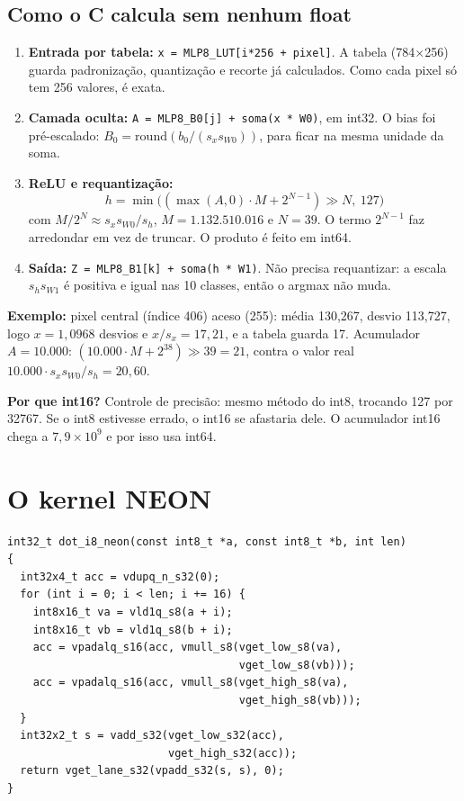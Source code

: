 \documentclass[10pt]{article}
\begin{document}
\subsection{Como o C calcula sem nenhum float}
\begin{enumerate}
\item \textbf{Entrada por tabela:} \texttt{x = MLP8\_LUT[i*256 + pixel]}. A tabela
      (784$\times$256) guarda padronização, quantização e recorte já calculados. Como cada pixel só
      tem 256 valores, é exata.
\item \textbf{Camada oculta:} \texttt{A = MLP8\_B0[j] + soma(x * W0)}, em int32. O bias foi
      pré-escalado: $B_0 = \mathrm{round}(b_0/(s_x s_{W0}))$, para ficar na mesma unidade da soma.
\item \textbf{ReLU e requantização:}
      \[h = \min\big((\max(A,0)\cdot M + 2^{N-1}) \gg N,\ 127\big)\]
      com $M/2^N \approx s_x s_{W0}/s_h$, $M = 1.132.510.016$ e $N = 39$. O termo $2^{N-1}$ faz
      arredondar em vez de truncar. O produto é feito em int64.
\item \textbf{Saída:} \texttt{Z = MLP8\_B1[k] + soma(h * W1)}. Não precisa requantizar: a escala
      $s_h s_{W1}$ é positiva e igual nas 10 classes, então o argmax não muda.
\end{enumerate}

\textbf{Exemplo:} pixel central (índice 406) aceso (255): média 130,267, desvio 113,727, logo
$x = 1{,}0968$ desvios e $x/s_x = 17{,}21$, e a tabela guarda 17. Acumulador $A=10.000$:
$(10.000\cdot M + 2^{38})\gg 39 = 21$, contra o valor real $10.000\cdot s_x s_{W0}/s_h = 20{,}60$.

\textbf{Por que int16?} Controle de precisão: mesmo método do int8, trocando 127 por 32767. Se o int8
estivesse errado, o int16 se afastaria dele. O acumulador int16 chega a $7{,}9\times10^9$ e por isso
usa int64.

\section{O kernel NEON}

\begin{lstlisting}
int32_t dot_i8_neon(const int8_t *a, const int8_t *b, int len)
{
  int32x4_t acc = vdupq_n_s32(0);
  for (int i = 0; i < len; i += 16) {
    int8x16_t va = vld1q_s8(a + i);
    int8x16_t vb = vld1q_s8(b + i);
    acc = vpadalq_s16(acc, vmull_s8(vget_low_s8(va),
                                    vget_low_s8(vb)));
    acc = vpadalq_s16(acc, vmull_s8(vget_high_s8(va),
                                    vget_high_s8(vb)));
  }
  int32x2_t s = vadd_s32(vget_low_s32(acc),
                         vget_high_s32(acc));
  return vget_lane_s32(vpadd_s32(s, s), 0);
}
\end{lstlisting}
\end{document}
